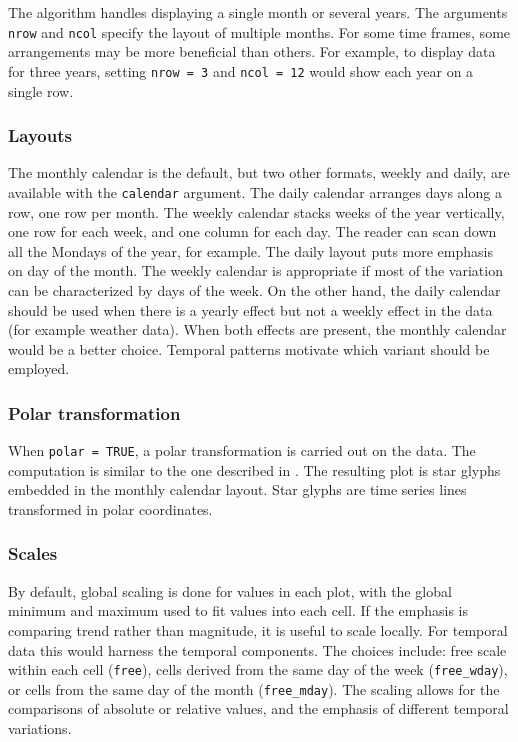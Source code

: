 \documentclass[12pt]{article}
\begin{document}
The algorithm handles displaying a single month or several years. The arguments \texttt{nrow} and \texttt{ncol} specify the layout of multiple months. For some time frames, some arrangements may be more beneficial than others. For example, to display data for three years, setting \texttt{nrow\ =\ 3} and \texttt{ncol\ =\ 12} would show each year on a single row.

\hypertarget{layouts}{%
\subsubsection{Layouts}\label{layouts}}

The monthly calendar is the default, but two other formats, weekly and daily, are available with the \texttt{calendar} argument. The daily calendar arranges days along a row, one row per month. The weekly calendar stacks weeks of the year vertically, one row for each week, and one column for each day. The reader can scan down all the Mondays of the year, for example. The daily layout puts more emphasis on day of the month. The weekly calendar is appropriate if most of the variation can be characterized by days of the week. On the other hand, the daily calendar should be used when there is a yearly effect but not a weekly effect in the data (for example weather data). When both effects are present, the monthly calendar would be a better choice. Temporal patterns motivate which variant should be employed.

\hypertarget{polar-transformation}{%
\subsubsection{Polar transformation}\label{polar-transformation}}

When \texttt{polar\ =\ TRUE}, a polar transformation is carried out on the data. The computation is similar to the one described in \citet{Wickham2012glyph}. The resulting plot is star glyphs embedded in the monthly calendar layout. Star glyphs are time series lines transformed in polar coordinates.



\hypertarget{scales}{%
\subsubsection{Scales}\label{scales}}

By default, global scaling is done for values in each plot, with the global minimum and maximum used to fit values into each cell. If the emphasis is comparing trend rather than magnitude, it is useful to scale locally. For temporal data this would harness the temporal components. The choices include: free scale within each cell (\texttt{free}), cells derived from the same day of the week (\texttt{free\_wday}), or cells from the same day of the month (\texttt{free\_mday}). The scaling allows for the comparisons of absolute or relative values, and the emphasis of different temporal variations.
\end{document}
